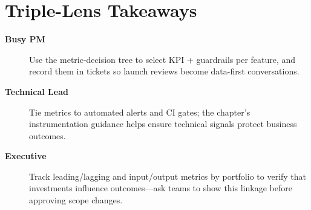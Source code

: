 \section{Triple-Lens Takeaways}
\label{sec:metrics-triple}

\begin{description}
    \item[\textbf{Busy PM}] Use the metric-decision tree to select KPI + guardrails per feature, and record them in tickets so launch reviews become data-first conversations.
    \item[\textbf{Technical Lead}] Tie metrics to automated alerts and CI gates; the chapter’s instrumentation guidance helps ensure technical signals protect business outcomes.
    \item[\textbf{Executive}] Track leading/lagging and input/output metrics by portfolio to verify that investments influence outcomes—ask teams to show this linkage before approving scope changes.
\end{description}
